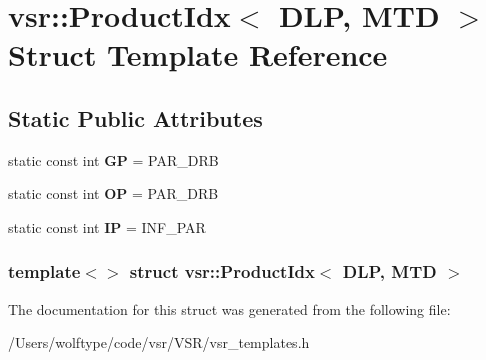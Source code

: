\hypertarget{structvsr_1_1_product_idx_3_01_d_l_p_00_01_m_t_d_01_4}{\section{vsr\-:\-:Product\-Idx$<$ D\-L\-P, M\-T\-D $>$ Struct Template Reference}
\label{structvsr_1_1_product_idx_3_01_d_l_p_00_01_m_t_d_01_4}
}
\subsection*{Static Public Attributes}
\begin{DoxyCompactItemize}
\item 
\hypertarget{structvsr_1_1_product_idx_3_01_d_l_p_00_01_m_t_d_01_4_a5a9087037bd72027bdaa60486e047b04}{static const int {\bfseries G\-P} = P\-A\-R\-\_\-\-D\-R\-B}\label{structvsr_1_1_product_idx_3_01_d_l_p_00_01_m_t_d_01_4_a5a9087037bd72027bdaa60486e047b04}

\item 
\hypertarget{structvsr_1_1_product_idx_3_01_d_l_p_00_01_m_t_d_01_4_a9716f39dfbcb967c3dbbf93015e90333}{static const int {\bfseries O\-P} = P\-A\-R\-\_\-\-D\-R\-B}\label{structvsr_1_1_product_idx_3_01_d_l_p_00_01_m_t_d_01_4_a9716f39dfbcb967c3dbbf93015e90333}

\item 
\hypertarget{structvsr_1_1_product_idx_3_01_d_l_p_00_01_m_t_d_01_4_a471f873479c9fa9bfa3f33f071f0f0f5}{static const int {\bfseries I\-P} = I\-N\-F\-\_\-\-P\-A\-R}\label{structvsr_1_1_product_idx_3_01_d_l_p_00_01_m_t_d_01_4_a471f873479c9fa9bfa3f33f071f0f0f5}

\end{DoxyCompactItemize}
\subsubsection*{template$<$$>$ struct vsr\-::\-Product\-Idx$<$ D\-L\-P, M\-T\-D $>$}



The documentation for this struct was generated from the following file\-:\begin{DoxyCompactItemize}
\item 
/\-Users/wolftype/code/vsr/\-V\-S\-R/vsr\-\_\-templates.\-h\end{DoxyCompactItemize}

